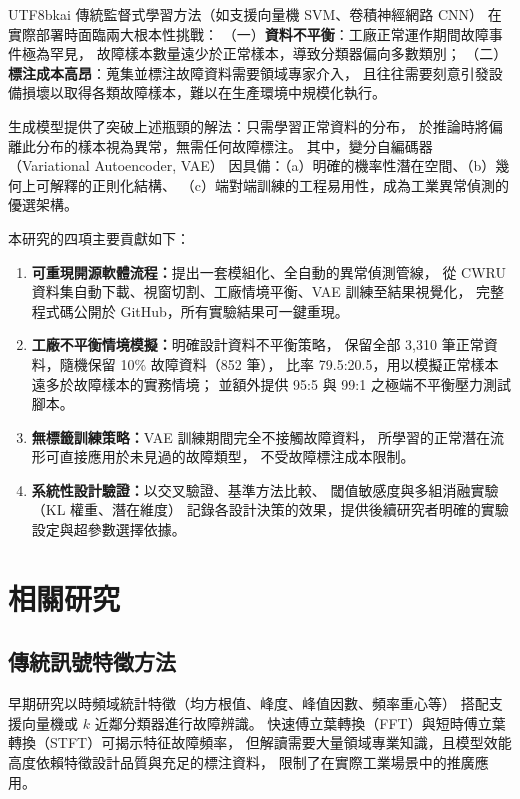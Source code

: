 \documentclass[conference]{IEEEtran}
\begin{document}
\begin{CJK}{UTF8}{bkai}
傳統監督式學習方法（如支援向量機 SVM、卷積神經網路 CNN）
在實際部署時面臨兩大根本性挑戰：
（一）\textbf{資料不平衡}：工廠正常運作期間故障事件極為罕見，
故障樣本數量遠少於正常樣本，導致分類器偏向多數類別；
（二）\textbf{標注成本高昂}：蒐集並標注故障資料需要領域專家介入，
且往往需要刻意引發設備損壞以取得各類故障樣本，難以在生產環境中規模化執行。

生成模型提供了突破上述瓶頸的解法：只需學習正常資料的分布，
於推論時將偏離此分布的樣本視為異常，無需任何故障標注。
其中，變分自編碼器（Variational Autoencoder, VAE）\cite{kingma2014auto}
因具備：（a）明確的機率性潛在空間、（b）幾何上可解釋的正則化結構、
（c）端對端訓練的工程易用性，成為工業異常偵測的優選架構。

本研究的四項主要貢獻如下：
\begin{enumerate}
  \item \textbf{可重現開源軟體流程：}提出一套模組化、全自動的異常偵測管線，
        從 CWRU 資料集自動下載、視窗切割、工廠情境平衡、VAE 訓練至結果視覺化，
        完整程式碼公開於 GitHub，所有實驗結果可一鍵重現。
  \item \textbf{工廠不平衡情境模擬：}明確設計資料不平衡策略，
        保留全部 3,310 筆正常資料，隨機保留 10\% 故障資料（852 筆），
        比率 79.5:20.5，用以模擬正常樣本遠多於故障樣本的實務情境；
        並額外提供 95:5 與 99:1 之極端不平衡壓力測試腳本。
  \item \textbf{無標籤訓練策略：}VAE 訓練期間完全不接觸故障資料，
        所學習的正常潛在流形可直接應用於未見過的故障類型，
        不受故障標注成本限制。
  \item \textbf{系統性設計驗證：}以交叉驗證、基準方法比較、
        閾值敏感度與多組消融實驗（KL 權重、潛在維度）
        記錄各設計決策的效果，提供後續研究者明確的實驗設定與超參數選擇依據。
\end{enumerate}

\section{相關研究}

\subsection{傳統訊號特徵方法}
早期研究以時頻域統計特徵（均方根值、峰度、峰值因數、頻率重心等）
搭配支援向量機或 $k$ 近鄰分類器進行故障辨識\cite{smith2015rolling}。
快速傅立葉轉換（FFT）與短時傅立葉轉換（STFT）可揭示特征故障頻率，
但解讀需要大量領域專業知識，且模型效能高度依賴特徵設計品質與充足的標注資料，
限制了在實際工業場景中的推廣應用。


\end{CJK}
\end{document}

